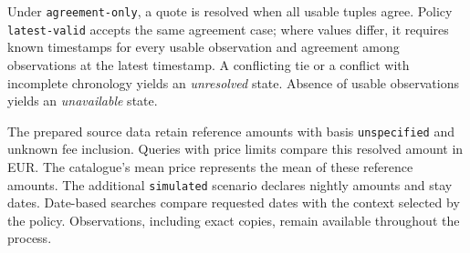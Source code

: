 Under \texttt{agreement-only}, a quote is resolved when all usable tuples agree. Policy \texttt{latest-valid} accepts the same agreement case; where values differ, it requires known timestamps for every usable observation and agreement among observations at the latest timestamp. A conflicting tie or a conflict with incomplete chronology yields an \emph{unresolved} state. Absence of usable observations yields an \emph{unavailable} state.

The prepared source data retain reference amounts with basis \texttt{unspecified} and unknown fee inclusion. Queries with price limits compare this resolved amount in EUR. The catalogue's mean price represents the mean of these reference amounts. The additional \texttt{simulated} scenario declares nightly amounts and stay dates. Date-based searches compare requested dates with the context selected by the policy. Observations, including exact copies, remain available throughout the process.
